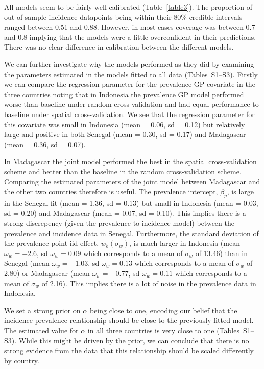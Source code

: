\documentclass{statsoc}
\begin{document}

All models seem to be fairly well calibrated (Table~\ref{table3}).
The proportion of out-of-sample incidence datapoints being within their 80\% credible intervals ranged between 0.51 and 0.88.
However, in most cases coverage was between 0.7 and 0.8 implying that the models were a little overconfident in their predictions.
There was no clear difference in calibration between the different models.


We can further investigate why the models performed as they did by examining the parameters estimated in the models fitted to all data (Tables~S1--S3).
Firstly we can compare the regression parameter for the prevalence GP covariate in the three countries noting that in Indonesia the prevalence GP model performed worse than baseline under random cross-validation and had equal performance to baseline under spatial cross-validation.
We see that the regression parameter for this covariate was small in Indonesia (mean = 0.06, sd = 0.12) but relatively large and positive in both Senegal (mean = 0.30, sd = 0.17) and Madagascar  (mean = 0.36, sd = 0.07).

In Madagascar the joint model performed the best in the spatial cross-validation scheme and better than the baseline in the random cross-validation scheme. 
Comparing the estimated parameters of the joint model between Madagascar and the other two countries therefore is useful.
The prevalence intercept, $\beta_p$, is large in the Senegal fit (mean = 1.36, sd = 0.13) but small in Indonesia (mean = 0.03, sd = 0.20) and Madagascar (mean = 0.07, sd = 0.10).
This implies there is a strong discrepency (given the prevalence to incidence model) between the prevalence and incidence data in Senegal.
Furthermore, the standard deviation of the prevalence point iid effect, $w_b(\sigma_w)$, is much larger in Indonesia (mean $\omega_w = -2.6$, sd $\omega_w = 0.09$ which corresponds to a mean of $\sigma_w$ of 13.46) than in Senegal (mean $\omega_w = -1.03$, sd $\omega_w = 0.13$ which corresponds to a mean of $\sigma_w$ of 2.80) or Madagascar (mean $\omega_w = -0.77$, sd $\omega_w = 0.11$ which corresponds to a mean of $\sigma_w$ of 2.16).
This implies there is a lot of noise in the prevalence data in Indonesia.

We set a strong prior on $\alpha$ being close to one, encoding our belief that the incidence prevalence relationship should be close to the previously fitted model.
The estimated value for $\alpha$ in all three countries is very close to one (Tables~S1--S3).
While this might be driven by the prior, we can conclude that there is no strong evidence from the data that this relationship should be scaled differently by country.
\end{document}
